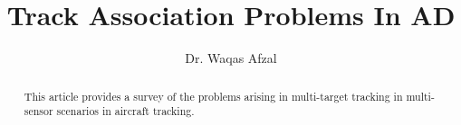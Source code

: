 \documentclass[a4paper]{article}
\title{Track Association Problems In AD}%
\author{Dr. Waqas Afzal}%
\begin{document}
%
%
\maketitle%
\printglossary[title=Nomenclature,nogroupskip,nonumberlist]
\printglossary[title=Acronyms,type=\acronymtype,nogroupskip,nonumberlist]
\begin{abstract}
This article provides a survey of the problems arising in multi-target tracking in multi-sensor scenarios in aircraft tracking.
\end{abstract}
\end{document}
